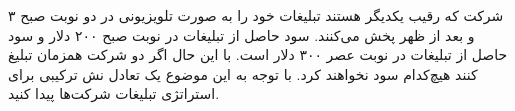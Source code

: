 ۳ شرکت که رقیب یکدیگر هستند تبلیغات خود را به صورت تلویزیونی در دو نوبت صبح و بعد از ظهر پخش می‌کنند. سود حاصل از تبلیغات در نوبت صبح ۲۰۰ دلار و سود حاصل از تبلیغات در نوبت عصر ۳۰۰ دلار است. با این حال اگر دو شرکت همزمان تبلیغ کنند هیچ‌کدام سود نخواهند کرد.
\vspace{2pt}
با توجه به این موضوع یک تعادل نش ترکیبی برای استراتژی تبلیغات شرکت‌ها پیدا کنید.